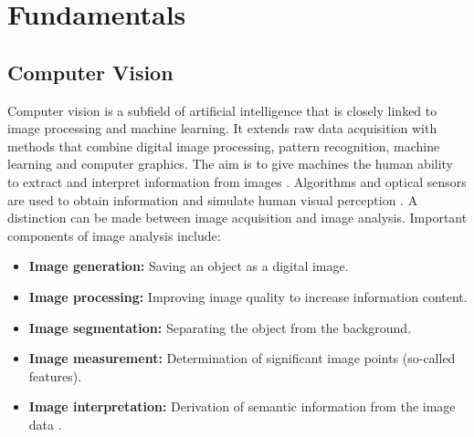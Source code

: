 \chapter{Fundamentals}
\label{ch:fundamentals}

\section{Computer Vision}
Computer vision is a subfield of artificial intelligence that is closely linked to image processing and machine learning. It extends raw data acquisition with methods that combine digital image processing, pattern recognition, machine learning and computer graphics. The aim is to give machines the human ability to extract and interpret information from images \citep{Wiley2018}. Algorithms and optical sensors are used to obtain information and simulate human visual perception \citep{Matiacevich2013}. A distinction can be made between image acquisition and image analysis. Important components of image analysis include:
\begin{itemize}
    \item \textbf{Image generation:} Saving an object as a digital image.
    \item \textbf{Image processing:} Improving image quality to increase information content.
    \item \textbf{Image segmentation:} Separating the object from the background.
    \item \textbf{Image measurement:} Determination of significant image points (so-called features).
    \item \textbf{Image interpretation:} Derivation of semantic information from the image data \citep{Mery2013}.
\end{itemize}





